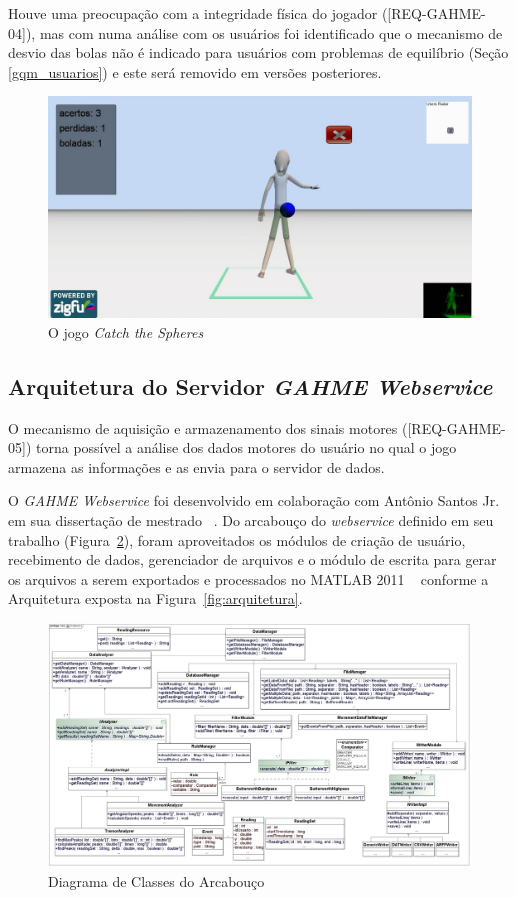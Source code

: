 Houve uma preocupação com a integridade física do jogador ([REQ-GAHME-04]), mas com numa análise com os usuários foi identificado que o mecanismo de desvio das bolas não é indicado para usuários com problemas de equilíbrio (Seção \ref{gqm_usuarios}) e este será removido em versões posteriores.

\begin{figure}[!htb]
     \centering
     \includegraphics[width=.6\textwidth]{./img/catch-the-spheres.png}
     \caption{O jogo \emph{Catch the Spheres}}
     \label{img:catch}
\end{figure}

\subsection{Arquitetura do Servidor \textit{GAHME Webservice}}
O mecanismo de aquisição e armazenamento dos sinais motores ([REQ-GAHME-05]) torna possível a análise dos dados motores do usuário no qual o jogo armazena as informações e as envia para o servidor de dados. 

O \textit{GAHME Webservice} foi desenvolvido em colaboração com Antônio Santos Jr. em sua dissertação de mestrado ~\cite{antonio2013}. Do arcabouço do \textit{webservice} definido em seu trabalho (Figura~\ref{img:classd}), foram aproveitados os módulos de criação de usuário, recebimento de dados, gerenciador de arquivos e o módulo de escrita para gerar os arquivos a serem exportados e processados no MATLAB 2011 ~\cite{matlab2011} conforme a Arquitetura exposta na Figura~\ref{fig:arquitetura}.

\begin{figure}[!htb]
     \centering
     \includegraphics[width=1\textwidth]{./img/class_diagram.png}
     \caption[Diagrama de Classes do Arcabouço]{Diagrama de Classes do Arcabouço ~\cite{antonio2013}}
     \label{img:classd}
\end{figure}

